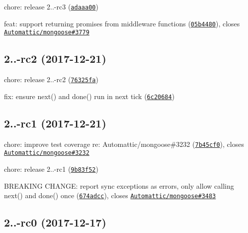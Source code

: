\begin{DoxyItemize}
\item chore\+: release 2..-\/rc3 (\href{https://github.com/vkarpov15/kareem/commit/adaaa00}{\tt adaaa00})
\item feat\+: support returning promises from middleware functions (\href{https://github.com/vkarpov15/kareem/commit/05b4480}{\tt 05b4480}), closes \href{https://github.com/Automattic/mongoose/issues/3779}{\tt Automattic/mongoose\#3779}
\end{DoxyItemize}

\label{_2.0.0-rc2}%
 \subsection*{2..-\/rc2 (2017-\/12-\/21)}


\begin{DoxyItemize}
\item chore\+: release 2..-\/rc2 (\href{https://github.com/vkarpov15/kareem/commit/76325fa}{\tt 76325fa})
\item fix\+: ensure next() and done() run in next tick (\href{https://github.com/vkarpov15/kareem/commit/6c20684}{\tt 6c20684})
\end{DoxyItemize}

\label{_2.0.0-rc1}%
 \subsection*{2..-\/rc1 (2017-\/12-\/21)}


\begin{DoxyItemize}
\item chore\+: improve test coverage re\+: Automattic/mongoose\#3232 (\href{https://github.com/vkarpov15/kareem/commit/7b45cf0}{\tt 7b45cf0}), closes \href{https://github.com/Automattic/mongoose/issues/3232}{\tt Automattic/mongoose\#3232}
\item chore\+: release 2..-\/rc1 (\href{https://github.com/vkarpov15/kareem/commit/9b83f52}{\tt 9b83f52})
\item B\+R\+E\+A\+K\+I\+NG C\+H\+A\+N\+GE\+: report sync exceptions as errors, only allow calling next() and done() once (\href{https://github.com/vkarpov15/kareem/commit/674adcc}{\tt 674adcc}), closes \href{https://github.com/Automattic/mongoose/issues/3483}{\tt Automattic/mongoose\#3483}
\end{DoxyItemize}

\label{_2.0.0-rc0}%
 \subsection*{2..-\/rc0 (2017-\/12-\/17)}


